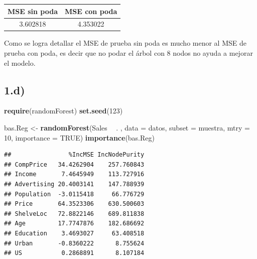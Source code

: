 \documentclass[
]{article}
\newenvironment{Shaded}{\begin{snugshade}}{\end{snugshade}}
\newcommand{\DataTypeTok}[1]{\textcolor[rgb]{0.13,0.29,0.53}{#1}}
\newcommand{\DecValTok}[1]{\textcolor[rgb]{0.00,0.00,0.81}{#1}}
\newcommand{\KeywordTok}[1]{\textcolor[rgb]{0.13,0.29,0.53}{\textbf{#1}}}
\newcommand{\NormalTok}[1]{#1}
\newcommand{\OperatorTok}[1]{\textcolor[rgb]{0.81,0.36,0.00}{\textbf{#1}}}
\newcommand{\OtherTok}[1]{\textcolor[rgb]{0.56,0.35,0.01}{#1}}
\newcommand{\StringTok}[1]{\textcolor[rgb]{0.31,0.60,0.02}{#1}}
\begin{document}
\begin{Shaded}
\end{Shaded}

\begin{table}[H]
\centering
\begin{tabular}{cc}
\toprule
MSE sin poda & MSE con poda\\
\midrule
3.602818 & 4.353022\\
\bottomrule
\end{tabular}
\end{table}

Como se logra detallar el MSE de prueba sin poda es mucho menor al MSE
de prueba con poda, es decir que no podar el árbol con 8 nodos no ayuda
a mejorar el modelo.

\hypertarget{d}{%
\subsection{1.d)}\label{d}}

\begin{Shaded}
\begin{Highlighting}[]
\KeywordTok{require}\NormalTok{(randomForest)}
\KeywordTok{set.seed}\NormalTok{(}\DecValTok{123}\NormalTok{)}

\NormalTok{bas.Reg <-}\StringTok{ }\KeywordTok{randomForest}\NormalTok{(Sales }\OperatorTok{~}\StringTok{ }\NormalTok{. , }\DataTypeTok{data =}\NormalTok{ datos, }\DataTypeTok{subset =}\NormalTok{ muestra, }\DataTypeTok{mtry =} \DecValTok{10}\NormalTok{, }\DataTypeTok{importance =} \OtherTok{TRUE}\NormalTok{)}
\KeywordTok{importance}\NormalTok{(bas.Reg)}
\end{Highlighting}
\end{Shaded}

\begin{verbatim}
##                %IncMSE IncNodePurity
## CompPrice   34.4262904    257.760843
## Income       7.4645949    113.727916
## Advertising 20.4003141    147.788939
## Population  -3.0115418     66.776729
## Price       64.3523306    630.500603
## ShelveLoc   72.8822146    689.811838
## Age         17.7747876    182.686692
## Education    3.4693027     63.408518
## Urban       -0.8360222      8.755624
## US           0.2868891      8.107184
\end{verbatim}
\end{document}
